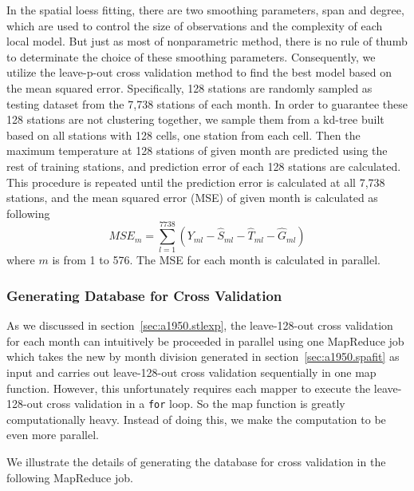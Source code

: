 In the spatial loess fitting, there are two smoothing parameters, span and degree,
which are used to control the size of observations and the complexity of each 
local model. But just as most of nonparametric method, there is no rule of thumb
to determinate the choice of these smoothing parameters. Consequently, we utilize 
the leave-p-out cross validation method to find the best model based on the mean 
squared error. Specifically, 128 stations are randomly sampled as testing dataset
from the 7,738 stations of each month. In order to guarantee these 128 stations
are not clustering together, we sample them from a kd-tree built based on all
stations with 128 cells, one station from each cell. Then the maximum temperature
at 128 stations of given month are predicted using the rest of training stations,
and prediction error of each 128 stations are calculated. This procedure is 
repeated until the prediction error is calculated at all 7,738 stations, and the
mean squared error (MSE) of given month is calculated as following
$$
MSE_m = \sum_{l=1}^{7738} \left( Y_{ml} - \hat S_{ml} - \hat T_{ml} - \hat G_{ml}
\right) 
$$
where $m$ is from 1 to 576. The MSE for each month is calculated in parallel.

\subsubsection{Generating Database for Cross Validation}

As we discussed in section~\ref{sec:a1950.stlexp}, the leave-128-out cross 
validation for each month can intuitively be proceeded in parallel using one 
MapReduce job which takes the new by month division generated in 
section~\ref{sec:a1950.spafit} as input and carries out leave-128-out cross 
validation sequentially in one map function. However, this unfortunately requires
each mapper to execute the leave-128-out cross validation in a \texttt{for} loop. 
So the map function is greatly computationally heavy. Instead of doing this, we
make the computation to be even more parallel. 

We illustrate the details of generating the database for cross validation in the
following MapReduce job.

